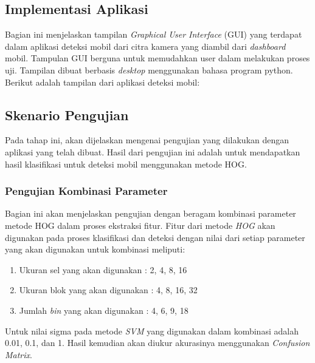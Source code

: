 \subsection{Implementasi Aplikasi}
Bagian ini menjelaskan tampilan \textit{Graphical User Interface} (GUI) yang terdapat dalam aplikasi deteksi mobil dari citra kamera yang diambil dari \textit{dashboard} mobil. Tampulan GUI berguna untuk memudahkan user dalam melakukan proses uji. Tampilan dibuat berbasis \textit{desktop} menggunakan bahasa program python. Berikut adalah tampilan dari aplikasi deteksi mobil:
\\

\subsection{Skenario Pengujian}
Pada tahap ini, akan dijelaskan mengenai pengujian yang dilakukan dengan aplikasi yang telah dibuat. Hasil dari pengujian ini adalah untuk mendapatkan hasil klasifikasi untuk deteksi mobil menggunakan metode HOG.
\\

\subsubsection{Pengujian Kombinasi Parameter}
Bagian ini akan menjelaskan pengujian dengan beragam kombinasi parameter metode HOG dalam proses ekstraksi fitur. Fitur dari metode \textit{HOG} akan digunakan pada proses klasifikasi dan deteksi dengan nilai dari setiap parameter yang akan digunakan untuk kombinasi meliputi:
\begin{enumerate}
	\item Ukuran sel yang akan digunakan : 2, 4, 8, 16
	\item Ukuran blok yang akan digunakan : 4, 8, 16, 32
	\item Jumlah \textit{bin} yang akan digunakan : 4, 6, 9, 18
\end{enumerate}
Untuk nilai sigma pada metode \textit{SVM} yang digunakan dalam kombinasi adalah 0.01, 0.1, dan 1. Hasil kemudian akan diukur akurasinya menggunakan \textit{Confusion Matrix}.\\

